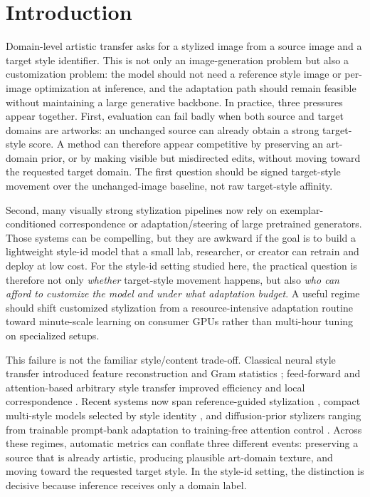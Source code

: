 \documentclass[letterpaper]{article}
\begin{document}
\section{Introduction}
Domain-level artistic transfer asks for a stylized image from a source image and a target style identifier. This is not only an image-generation problem but also a customization problem: the model should not need a reference style image or per-image optimization at inference, and the adaptation path should remain feasible without maintaining a large generative backbone. In practice, three pressures appear together. First, evaluation can fail badly when both source and target domains are artworks: an unchanged source can already obtain a strong target-style score. A method can therefore appear competitive by preserving an art-domain prior, or by making visible but misdirected edits, without moving toward the requested target domain. The first question should be signed target-style movement over the unchanged-image baseline, not raw target-style affinity.

Second, many visually strong stylization pipelines now rely on exemplar-conditioned correspondence or adaptation/steering of large pretrained generators. Those systems can be compelling, but they are awkward if the goal is to build a lightweight style-id model that a small lab, researcher, or creator can retrain and deploy at low cost. For the style-id setting studied here, the practical question is therefore not only \emph{whether} target-style movement happens, but also \emph{who can afford to customize the model and under what adaptation budget}. A useful regime should shift customized stylization from a resource-intensive adaptation routine toward minute-scale learning on consumer GPUs rather than multi-hour tuning on specialized setups.

This failure is not the familiar style/content trade-off. Classical neural style transfer introduced feature reconstruction and Gram statistics \cite{gatys2016image}; feed-forward and attention-based arbitrary style transfer improved efficiency and local correspondence \cite{huang2017adain,park2019sanet,deng2022stytr2,zheng2024puffnet}. Recent systems now span reference-guided stylization \cite{hong2023aespa,huang2024aesfa,zhang2025hsi,shang2025scsa}, compact multi-style models selected by style identity \cite{liu2024samst}, and diffusion-prior stylizers ranging from trainable prompt-bank adaptation to training-free attention control \cite{zhang2024artbank,chung2024styleid,deng2024zstar,jiang2025sms,xu2025stylessp}. Across these regimes, automatic metrics can conflate three different events: preserving a source that is already artistic, producing plausible art-domain texture, and moving toward the requested target style. In the style-id setting, the distinction is decisive because inference receives only a domain label.
\end{document}
